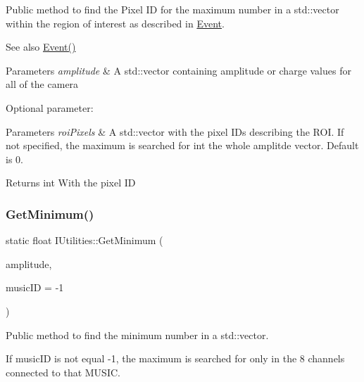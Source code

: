 Public method to find the Pixel ID for the maximum number in a std\+::vector within the region of interest as described in \hyperlink{classEvent}{Event}. 

\begin{DoxySeeAlso}{See also}
\hyperlink{classEvent}{Event()}
\end{DoxySeeAlso}

\begin{DoxyParams}{Parameters}
{\em amplitude} & A std\+::vector containing amplitude or charge values for all of the camera\\
\hline
\end{DoxyParams}
Optional parameter\+: 
\begin{DoxyParams}{Parameters}
{\em roi\+Pixels} & A std\+::vector with the pixel I\+Ds describing the R\+OI. If not specified, the maximum is searched for int the whole amplitde vector. Default is 0.\\
\hline
\end{DoxyParams}
\begin{DoxyReturn}{Returns}
int With the pixel ID 
\end{DoxyReturn}
\mbox{\label{classIUtilities_a9b38571c8548ab538cc65aad6f238fe8}} 
\subsubsection{\texorpdfstring{Get\+Minimum()}{GetMinimum()}\hspace{0.1cm}{\footnotesize\ttfamily [1/2]}}
{\footnotesize\ttfamily static float I\+Utilities\+::\+Get\+Minimum (\begin{DoxyParamCaption}\item[{std\+::vector$<$ float $>$}]{amplitude,  }\item[{int}]{music\+ID = {\ttfamily -\/1} }\end{DoxyParamCaption})\hspace{0.3cm}{\ttfamily [static]}}



Public method to find the minimum number in a std\+::vector. 

If music\+ID is not equal -\/1, the maximum is searched for only in the 8 channels connected to that M\+U\+S\+IC.



